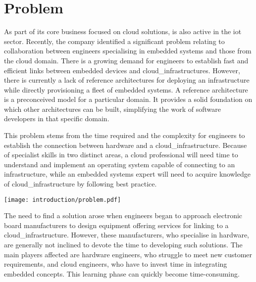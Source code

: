 \section{Problem}

As part of its core business focused on \gls{cloud} solutions,  is also active in the \acrshort{iot} sector. Recently, the company identified a significant problem relating to collaboration between engineers specialising in embedded systems and those from the \gls{cloud} domain. There is a growing demand for engineers to establish fast and efficient links between embedded devices and \glspl{cloud_infrastructure}. However, there is currently a lack of reference architectures for deploying an infrastructure while directly provisioning a fleet of embedded systems. A reference architecture is a preconceived model for a particular domain. It provides a solid foundation on which other architectures can be built, simplifying the work of software developers in that specific domain.

This problem stems from the time required and the complexity for engineers to establish the connection between hardware and a \gls{cloud_infrastructure}. Because of specialist skills in two distinct areas, a \gls{cloud} professional will need time to understand and implement an operating system capable of connecting to an infrastructure, while an embedded systems expert will need to acquire knowledge of \gls{cloud_infrastructure} by following  best practice.
\begin{center}
    \begingroup
    \texttt{[image: introduction/problem.pdf]}
    \label{fig:problem}
    \endgroup
\end{center}
The need to find a solution arose when engineers began to approach electronic board manufacturers to design equipment offering services for linking to a \gls{cloud_infrastructure}. However, these manufacturers, who specialise in hardware, are generally not inclined to devote the time to developing such solutions. The main players affected are hardware engineers, who struggle to meet new customer requirements, and \gls{cloud} engineers, who have to invest time in integrating embedded concepts. This learning phase can quickly become time-consuming.

